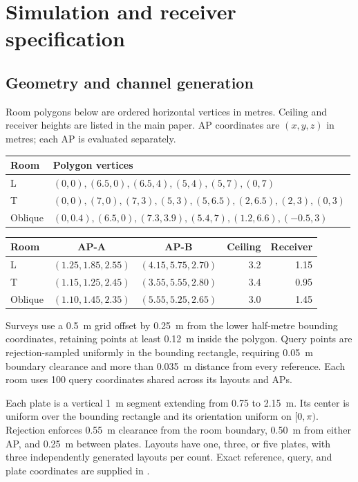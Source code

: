 \documentclass[10pt]{article}
\begin{document}
\section{Simulation and receiver specification}
\subsection{Geometry and channel generation}
Room polygons below are ordered horizontal vertices in metres. Ceiling and receiver heights are listed in the main paper. AP coordinates are $(x,y,z)$ in metres; each AP is evaluated separately.
\begin{center}
\begin{tabular}{lp{10.8cm}}
\toprule
Room & Polygon vertices\\\midrule
L & $(0,0),(6.5,0),(6.5,4),(5,4),(5,7),(0,7)$\\
T & $(0,0),(7,0),(7,3),(5,3),(5,6.5),(2,6.5),(2,3),(0,3)$\\
Oblique & $(0,0.4),(6.5,0),(7.3,3.9),(5.4,7),(1.2,6.6),(-0.5,3)$\\\bottomrule
\end{tabular}
\end{center}
\begin{center}
\begin{tabular}{lccrr}
\toprule
Room & AP-A & AP-B & Ceiling & Receiver\\\midrule
L & $(1.25,1.85,2.55)$ & $(4.15,5.75,2.70)$ & 3.2 & 1.15\\
T & $(1.15,1.25,2.45)$ & $(3.55,5.55,2.80)$ & 3.4 & 0.95\\
Oblique & $(1.10,1.45,2.35)$ & $(5.55,5.25,2.65)$ & 3.0 & 1.45\\\bottomrule
\end{tabular}
\end{center}
Surveys use a 0.5~m grid offset by 0.25~m from the lower half-metre bounding coordinates, retaining points at least 0.12~m inside the polygon. Query points are rejection-sampled uniformly in the bounding rectangle, requiring 0.05~m boundary clearance and more than 0.035~m distance from every reference. Each room uses 100 query coordinates shared across its layouts and APs.

Each plate is a vertical 1~m segment extending from 0.75 to 2.15~m. Its center is uniform over the bounding rectangle and its orientation uniform on $[0,\pi)$. Rejection enforces 0.55~m clearance from the room boundary, 0.50~m from either AP, and 0.25~m between plates. Layouts have one, three, or five plates, with three independently generated layouts per count. Exact reference, query, and plate coordinates are supplied in .
\end{document}
